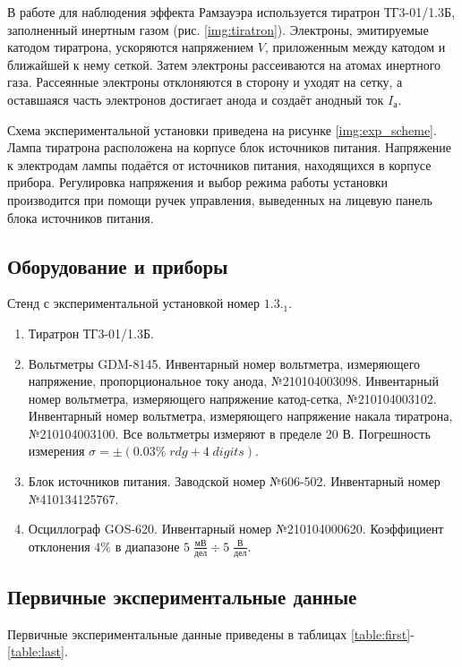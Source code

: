 \documentclass[10pt,a4paper]{article}
\begin{document}
	В работе для наблюдения эффекта Рамзауэра используется тиратрон ТГ3-01/1.3Б, заполненный инертным газом (рис. \ref{img:tiratron}). Электроны, эмитируемые катодом тиратрона, ускоряются напряжением $V$, приложенным между катодом и ближайшей к нему сеткой. Затем электроны рассеиваются на атомах инертного газа. Рассеянные электроны отклоняются в сторону и уходят на сетку, а оставшаяся часть электронов достигает анода и создаёт анодный ток $I_а$.
	
	Схема экспериментальной установки приведена на рисунке \ref{img:exp_scheme}. Лампа тиратрона расположена на корпусе блок источников питания. Напряжение к электродам лампы подаётся от источников питания, находящихся в корпусе прибора. Регулировка напряжения и выбор режима работы установки производится при помощи ручек управления, выведенных на лицевую панель блока источников питания.	
	
	\subsection*{Оборудование и приборы}
		
	Стенд с экспериментальной установкой номер $1.3._1$.
	\begin{enumerate}
		\item Тиратрон ТГ3-01/1.3Б.
				
		\item Вольтметры GDM-8145. Инвентарный номер вольтметра, измеряющего напряжение, пропорциональное току анода, №210104003098. Инвентарный номер вольтметра, измеряющего напряжение катод-сетка, №210104003102. Инвентарный номер вольтметра, измеряющего напряжение накала тиратрона, №210104003100. Все вольтметры измеряют в пределе 20 В. Погрешность измерения $\sigma = \pm (0.03\% \; rdg + 4 \; digits)$.
		
		\item Блок источников питания. Заводской номер №606-502. Инвентарный номер №410134125767.
		
		\item Осциллограф GOS-620. Инвентарный номер №210104000620. Коэффициент отклонения $4\%$ в диапазоне $5 \; \frac{мВ}{дел} \div 5 \; \frac{В}{дел}$.
	\end{enumerate}
	
	\subsection*{Первичные экспериментальные данные}
	
	Первичные экспериментальные данные приведены в таблицах \ref{table:first}-\ref{table:last}.
	
\end{document}
